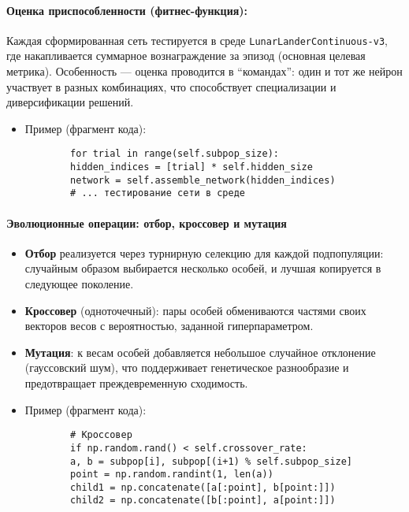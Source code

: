 \documentclass[a4paper,12pt]{article}
\begin{document}
\paragraph{Оценка приспособленности (фитнес-функция):}

Каждая сформированная сеть тестируется в среде \texttt{LunarLanderContinuous-v3}, где накапливается суммарное вознаграждение за эпизод (основная целевая метрика). Особенность — оценка проводится в ``командах'': один и тот же нейрон участвует в разных комбинациях, что способствует специализации и диверсификации решений.

\begin{itemize}
	\item[] Пример (фрагмент кода):
	\begin{lstlisting}
		for trial in range(self.subpop_size):
		hidden_indices = [trial] * self.hidden_size
		network = self.assemble_network(hidden_indices)
		# ... тестирование сети в среде
	\end{lstlisting}
\end{itemize}

\paragraph{Эволюционные операции: отбор, кроссовер и мутация}
\begin{itemize}
	\item \textbf{Отбор} реализуется через турнирную селекцию для каждой подпопуляции: случайным образом выбирается несколько особей, и лучшая копируется в следующее поколение.
	\item \textbf{Кроссовер} (одноточечный): пары особей обмениваются частями своих векторов весов с вероятностью, заданной гиперпараметром.
	\item \textbf{Мутация}: к весам особей добавляется небольшое случайное отклонение (гауссовский шум), что поддерживает генетическое разнообразие и предотвращает преждевременную сходимость.
\end{itemize}

\begin{itemize}
	\item[] Пример (фрагмент кода):
	\begin{lstlisting}
		# Кроссовер
		if np.random.rand() < self.crossover_rate:
		a, b = subpop[i], subpop[(i+1) % self.subpop_size]
		point = np.random.randint(1, len(a))
		child1 = np.concatenate([a[:point], b[point:]])
		child2 = np.concatenate([b[:point], a[point:]])
	\end{lstlisting}
\end{itemize}
\end{document}
